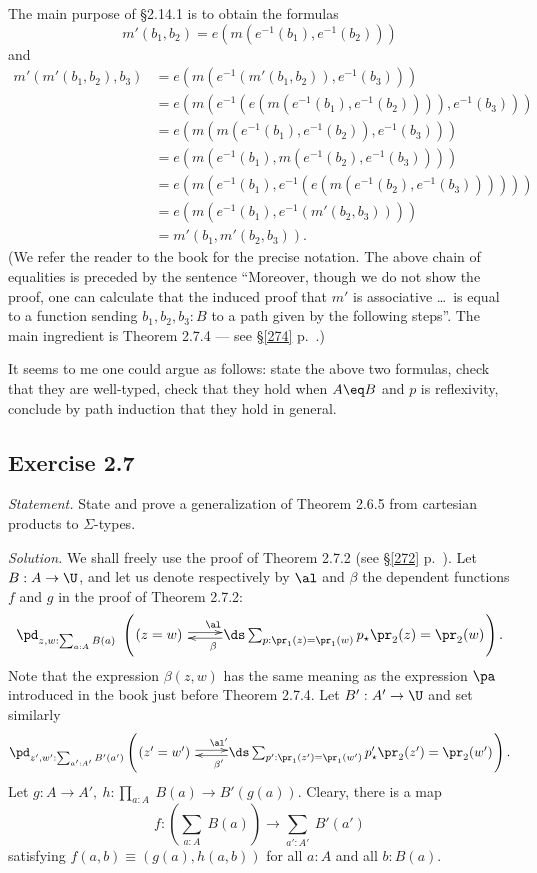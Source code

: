 \documentclass[12pt]{article}
\begin{document}
The main purpose of \S2.14.1 is to obtain the formulas
$$
m'(b_1,b_2)=e(m(e^{-1}(b_1),e^{-1}(b_2)))
$$ 
and
\begin{equation*}
  \begin{aligned}
    m'(m'(b_1,b_2),b_3)
    &= e(m(e^{-1}(m'(b_1,b_2)),e^{-1}(b_3))) \\
    &= e(m(e^{-1}(e(m(e^{-1}(b_1),e^{-1}(b_2)))),e^{-1}(b_3))) \\
    &= e(m(m(e^{-1}(b_1),e^{-1}(b_2)),e^{-1}(b_3))) \\
    &= e(m(e^{-1}(b_1),m(e^{-1}(b_2),e^{-1}(b_3)))) \\
    &= e(m(e^{-1}(b_1),e^{-1}(e(m(e^{-1}(b_2),e^{-1}(b_3)))))) \\
    &= e(m(e^{-1}(b_1),e^{-1}(m'(b_2,b_3)))) \\
    &= m'(b_1,m'(b_2,b_3)).
\end{aligned}
\end{equation*}
(We refer the reader to the book for the precise notation. The above chain of equalities is preceded by the sentence ``Moreover, though we do not show the proof, one can calculate that the induced proof that $m'$ is associative \dots\ is equal to a function sending $b_1,b_2,b_3:B$ to a path given by the following steps''. The main ingredient is Theorem 2.7.4 --- see \S\ref{274} p.~\pageref{274}.)

It seems to me one could argue as follows: state the above two formulas, check that they are well-typed, check that they hold when $A\eq B$ and $p$ is reflexivity, conclude by path induction that they hold in general.



\subsection{Exercise 2.7}

\emph{Statement.} State and prove a generalization of Theorem 2.6.5 from cartesian products to $\Sigma$-types. 

\nn\emph{Solution.} We shall freely use the proof of Theorem 2.7.2 (see \S\ref{272} p.~\pageref{272}). Let $B:A\to\U$, and let us denote respectively by $\al$ and $\beta$ the dependent functions $f$ and $g$ in the proof of Theorem 2.7.2:
$$
\pd_{z,w:\sum_{a:A}B(a)}\ \left(\xymatrix@1{
(z=w)\ \ar@<2pt>[r]^(.27)\al&\ds\sum_{p:\pr_1(z)=\pr_1(w)}p_\star \pr_2(z)=\pr_2(w)\ar@<2pt>[l]^(.73)\beta}\right).
$$ 
Note that the expression $\beta(z,w)$ has the same meaning as the expression $\pa$ introduced in the book just before Theorem 2.7.4. Let $B':A'\to\U$ and set similarly 
$$
\pd_{z',w':\sum_{a':A'}B'(a')}\left(\xymatrix@1{
(z'=w')\ \ar@<2pt>[r]^(.27){\al'}&\ds\sum_{p':\pr_1(z')=\pr_1(w')}p'_\star \pr_2(z')=\pr_2(w')\ar@<2pt>[l]^(.73){\beta'}}\right).
$$ 
Let $g:A\to A',\ h:\prod_{a:A}\ B(a)\to B'(g(a))$. Cleary, there is a map 
$$
f:\left(\sum_{a:A}\ B(a)\right)\to\sum_{a':A'}\ B'(a')
$$ 
satisfying $f(a,b)\equiv (g(a),h(a,b))$ for all $a:A$ and all $b:B(a)$. 
\end{document}
